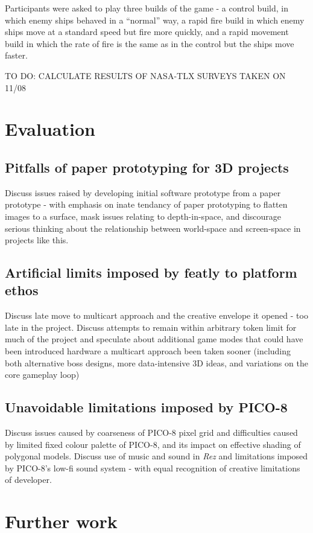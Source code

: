 \documentclass{article}
\begin{document}
Participants were asked to play three builds of the game - a control build, in which enemy
ships behaved in a ``normal'' way, a rapid fire build in which enemy ships move at a standard
speed but fire more quickly, and a rapid movement build in which the rate of fire is the same
as in the control but the ships move faster.

TO DO: CALCULATE RESULTS OF NASA-TLX SURVEYS TAKEN ON 11/08


\section{Evaluation}
\subsection{Pitfalls of paper prototyping for 3D projects}
Discuss issues raised by developing initial software prototype from a paper prototype
- with emphasis on inate tendancy of paper prototyping to flatten images to a surface,
mask issues relating to depth-in-space, and discourage serious thinking about the
relationship between world-space and screen-space in projects like this.
\subsection{Artificial limits imposed by featly to platform ethos}
Discuss late move to multicart approach and the creative envelope it opened - too late
in the project. Discuss attempts to remain within arbitrary token limit for much of the
project and speculate about additional game modes that could have been introduced hardware
a multicart approach been taken sooner (including both alternative boss designs, more
data-intensive 3D ideas, and variations on the core gameplay loop)
\subsection{Unavoidable limitations imposed by PICO-8}
Discuss issues caused by coarseness of PICO-8 pixel grid and difficulties caused by
limited fixed colour palette of PICO-8, and its impact on effective shading of polygonal
models. Discuss use of music and sound in \textit{Rez} and limitations imposed by PICO-8's
low-fi sound system - with equal recognition of creative limitations of developer.


\section{Further work}
\end{document}
